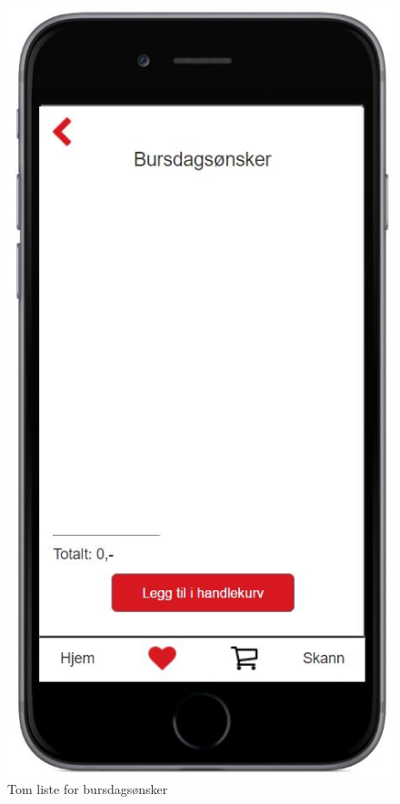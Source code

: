 \begin{figure}[H]
\includegraphics[scale=0.55]{images/axurebilder/bursdagsonsker_tom}
\centering %
\caption{Tom liste for bursdagsønsker}
\label{fig:bursdagsonsker_tom}
\end{figure}

